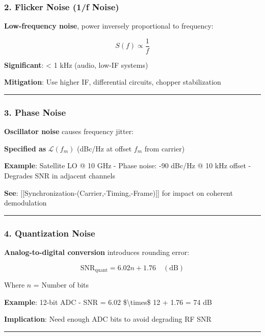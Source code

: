 \subsubsection{2. Flicker Noise (1/f
Noise)}\label{flicker-noise-1f-noise}

\textbf{Low-frequency noise}, power inversely proportional to frequency:

\[
S(f) \propto \frac{1}{f}
\]

\textbf{Significant}: \textless{} 1 kHz (audio, low-IF systems)

\textbf{Mitigation}: Use higher IF, differential circuits, chopper
stabilization

\begin{center}\rule{0.5\linewidth}{0.5pt}\end{center}

\subsubsection{3. Phase Noise}\label{phase-noise}

\textbf{Oscillator noise} causes frequency jitter:

\textbf{Specified as} \(\mathcal{L}(f_m)\) (dBc/Hz at offset \(f_m\)
from carrier)

\textbf{Example}: Satellite LO @ 10 GHz - Phase noise: -90 dBc/Hz @ 10
kHz offset - Degrades SNR in adjacent channels

\textbf{See}: {[}{[}Synchronization-(Carrier,-Timing,-Frame){]}{]} for
impact on coherent demodulation

\begin{center}\rule{0.5\linewidth}{0.5pt}\end{center}

\subsubsection{4. Quantization Noise}\label{quantization-noise}

\textbf{Analog-to-digital conversion} introduces rounding error:

\[
\text{SNR}_{\text{quant}} = 6.02n + 1.76 \quad (\text{dB})
\]

Where \(n\) = Number of bits

\textbf{Example}: 12-bit ADC - SNR = 6.02 \$\textbackslash times\$ 12 +
1.76 = 74 dB

\textbf{Implication}: Need enough ADC bits to avoid degrading RF SNR

\begin{center}\rule{0.5\linewidth}{0.5pt}\end{center}

